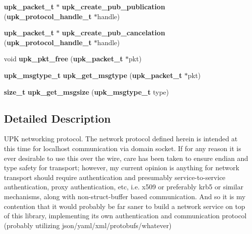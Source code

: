 \begin{DoxyCompactItemize}
\item 
{\bf upk\_\-packet\_\-t} $\ast$ {\bf upk\_\-create\_\-pub\_\-publication} ({\bf upk\_\-protocol\_\-handle\_\-t} $\ast$handle)
\item 
{\bf upk\_\-packet\_\-t} $\ast$ {\bf upk\_\-create\_\-pub\_\-cancelation} ({\bf upk\_\-protocol\_\-handle\_\-t} $\ast$handle)
\item 
void {\bf upk\_\-pkt\_\-free} ({\bf upk\_\-packet\_\-t} $\ast$pkt)
\item 
{\bf upk\_\-msgtype\_\-t} {\bf upk\_\-get\_\-msgtype} ({\bf upk\_\-packet\_\-t} $\ast$pkt)
\item 
{\bf size\_\-t} {\bf upk\_\-get\_\-msgsize} ({\bf upk\_\-msgtype\_\-t} type)
\end{DoxyCompactItemize}


\subsection{Detailed Description}
UPK networking protocol. The network protocol defined herein is intended at this time for localhost communication via domain socket. If for any reason it is ever desirable to use this over the wire, care has been taken to ensure endian and type safety for transport; however, my current opinion is anything for network transport should require authentication and presumably service-\/to-\/service authentication, proxy authentication, etc, i.e. x509 or preferably krb5 or similar mechanisms, along with non-\/struct-\/buffer based communication. And so it is my contention that it would probably be far saner to build a network service on top of this library, implementing its own authentication and communication protocol (probably utilizing json/yaml/xml/protobufs/whatever) 